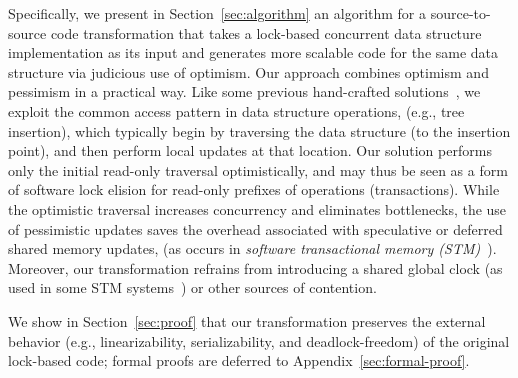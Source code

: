 Specifically, we present in Section~\ref{sec:algorithm} an algorithm for a source-to-source
code transformation that takes a lock-based concurrent data structure implementation as its input
and generates more scalable code for the same data structure via judicious use of optimism.
Our approach combines optimism and pessimism in a practical way.
Like some previous hand-crafted solutions~\cite{LazyList}, 
we exploit the common access pattern in data structure operations,
(e.g., tree insertion), which typically begin by traversing the data structure (to the insertion point), and then perform local updates at that location.
Our solution performs only the initial read-only traversal optimistically, and 
may thus be seen as a form of software lock elision for read-only prefixes of operations (transactions).
%
While the
optimistic traversal increases concurrency and eliminates bottlenecks,
the use of pessimistic updates saves the overhead associated with speculative or deferred shared
memory updates, (as occurs in \emph{software transactional memory (STM)}~\cite{HLR:SLCA2010}).
%
Moreover, our transformation
refrains from introducing a shared global clock (as used in some STM systems~\cite{DBLP:conf/eurosys/ShalevS06}) or other sources of contention. 

We show in Section~\ref{sec:proof} that our transformation preserves the external behavior (e.g., linearizability, serializability, and deadlock-freedom) of the original lock-based code; formal proofs are deferred to Appendix~\ref{sec:formal-proof}.


